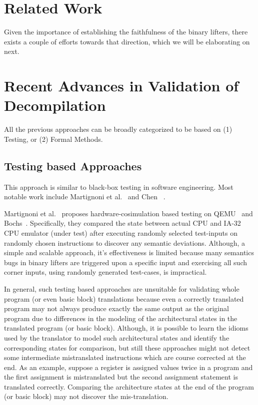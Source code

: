 \section{Related Work}\label{sec:RW}

Given the importance of establishing the faithfulness of the binary lifters,
      there exists a couple of efforts towards that direction, which we will be
      elaborating on next.

\section{Recent Advances in Validation of Decompilation}\label{sec:recent-advances}
All the previous approaches can be broadly categorized to be based on (1)
  Testing, or (2) Formal Methods.

\subsection{Testing based Approaches}
This approach is similar to black-box testing in software engineering. Most
notable work include Martignoni et
al.~\cite{Martignoni:ISSTA2009, Martignoni:ISSTA2010,Martignoni:ASPLOS2012} and
Chen \etal~\cite{CLSS2015}.


Martignoni et al.~\cite{Martignoni:ISSTA2009, Martignoni:ISSTA2010} proposes
hardware-cosimulation based testing on QEMU~\cite{QEMU:USENIX05} and
Bochs~\cite{Bochs1996}.  Specifically, they compared the state between actual
CPU and  IA-32 CPU emulator (under test) after executing randomly selected
test-inputs on randomly chosen instructions  to discover any semantic
deviations. Although, a simple and scalable approach, it's effectiveness is
limited because many semantics bugs in binary lifters are triggered upon a
specific input and exercising all such corner inputs, using randomly generated
test-cases, is impractical.


In general, such testing based approaches are unsuitable for validating whole
program (or even basic block) translations because even a correctly translated
program may not always produce exactly the same output as the original program
due to differences in the modeling of the architectural states in the
translated program (or basic block). Although, it is possible  to learn the
idioms used by the translator to model such architectural states and identify
the corresponding states for comparison, but still these approaches might not
detect some intermediate mistranslated instructions which are course corrected
at the end. As an example, suppose  a register is assigned values twice in a
program and the first assignment is mistranslated but the second assignment
statement is translated correctly. Comparing the architecture states at the end
of the program (or basic block) may not discover the mis-translation.

